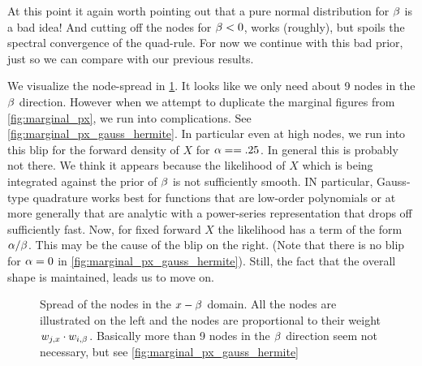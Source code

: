 \documentclass{article}
\begin{document}
At this point it again worth pointing out that a pure normal distribution for
${\beta}$ is a bad idea! And cutting off the nodes for ${\beta}<0$, works (roughly), but
spoils the spectral convergence of the quad-rule. For now we continue with
this bad prior, just so we can compare with our previous results. 

We visualize the node-spread in \cref{fig:hermite_nodes}. It looks like we only
need about 9 nodes in the ${\beta}$ direction. However when we attempt to duplicate
the marginal figures from \cref{fig:marginal_px}, we run into complications. See
\cref{fig:marginal_px_gauss_hermite}. In particular even at high nodes, we run
into this blip for the forward density of $X$ for ${\alpha} = =.25$. In general this
is probably not there. We think it appears because the likelihood of $X$ which
is being integrated against the prior of ${\beta}$ is not sufficiently smooth. IN
particular, Gauss-type quadrature works best for functions that are low-order
polynomials or at more generally that are analytic with a power-series
representation that drops off sufficiently fast. Now, for fixed forward $X$ the
likelihood has a term of the form ${\alpha} / {\beta}$. This may be the cause of the blip
on the right. (Note that there is no blip for
${\alpha}=0$ in \cref{fig:marginal_px_gauss_hermite}). Still, the fact that the overall shape is
maintained, leads us to move on. 
\begin{figure}[h]
\begin{center}
\caption{Spread of the nodes in the $x-{\beta}$ domain. All the nodes
are illustrated on the left and the nodes are proportional to their weight
$w_{j,x} \cdot w_{i,{\beta}}$. Basically more than 9 nodes in the ${\beta}$ direction seem  
not necessary, but see \cref{fig:marginal_px_gauss_hermite}}
\label{fig:hermite_nodes}
\end{center}
\end{figure}
\end{document}
